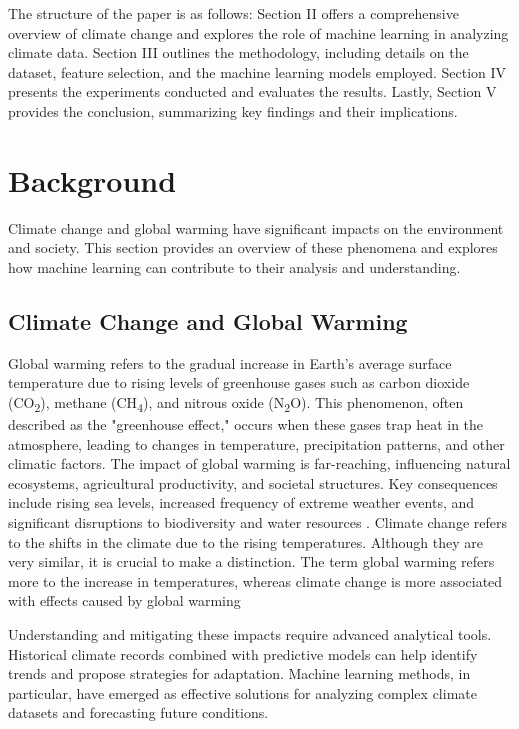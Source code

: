 \documentclass[conference]{IEEEtran}
\begin{document}
The structure of the paper is as follows: Section II offers a comprehensive overview of climate change and explores the role of machine learning in analyzing climate data. Section III outlines the methodology, including details on the dataset, feature selection, and the machine learning models employed. Section IV presents the experiments conducted and evaluates the results. Lastly, Section V provides the conclusion, summarizing key findings and their implications.

\section{Background}

Climate change and global warming have significant impacts on the environment and society. This section provides an overview of these phenomena and explores how machine learning can contribute to their analysis and understanding.

\subsection{Climate Change and Global Warming}
Global warming refers to the gradual increase in Earth's average surface temperature due to rising levels of greenhouse gases such as carbon dioxide (CO\textsubscript{2}), methane (CH\textsubscript{4}), and nitrous oxide (N\textsubscript{2}O). This phenomenon, often described as the "greenhouse effect," occurs when these gases trap heat in the atmosphere, leading to changes in temperature, precipitation patterns, and other climatic factors. The impact of global warming is far-reaching, influencing natural ecosystems, agricultural productivity, and societal structures. Key consequences include rising sea levels, increased frequency of extreme weather events, and significant disruptions to biodiversity and water resources \cite{b8}\cite{b9}. Climate change refers to the shifts in the climate due to the rising temperatures. Although they are very similar, it is crucial to make a distinction. The term global warming refers more to the increase in temperatures, whereas climate change is more associated with effects caused by global warming\cite{b12} 

Understanding and mitigating these impacts require advanced analytical tools. Historical climate records combined with predictive models can help identify trends and propose strategies for adaptation. Machine learning methods, in particular, have emerged as effective solutions for analyzing complex climate datasets and forecasting future conditions.
\end{document}
